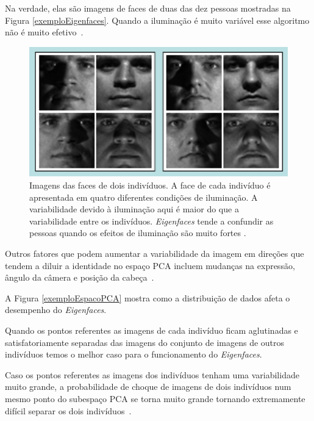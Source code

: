 Na verdade, elas são imagens de faces de duas das dez pessoas mostradas na Figura \ref{exemploEigenfaces}. Quando a iluminação é muito variável esse algoritmo não é muito efetivo~\cite{hewitt}.

	\begin{figure}[hbt]
		\begin{center}
			\includegraphics[width=15cm]{figuras/2.FundamentacaoTeorica/exemplosImagensIluminacaoo.png}
		\end{center}
		\caption{Imagens das faces de dois indivíduos. A face de cada indivíduo é apresentada em quatro diferentes condições de iluminação. A variabilidade devido à iluminação aqui é maior do que a variabilidade entre os indivíduos. \textit{Eigenfaces} tende a confundir as pessoas quando os efeitos de iluminação são muito fortes \cite{hewitt}.}
		\label{exemplosImagensIluminacaoo}
	\end{figure}

Outros fatores que podem aumentar a variabilidade da imagem em direções que tendem a diluir a identidade no espaço PCA incluem mudanças na expressão, ângulo da câmera e posição da cabeça~\cite{hewitt}.

A Figura \ref{exemploEspacoPCA} mostra como a distribuição de dados afeta o desempenho do \textit{Eigenfaces}.

Quando os pontos referentes as imagens de cada indivíduo ficam aglutinadas e satisfatoriamente separadas das imagens do conjunto de imagens de outros indivíduos temos o melhor caso para o funcionamento do \textit{Eigenfaces}.

Caso os pontos referentes as imagens dos indivíduos tenham uma variabilidade muito grande, a probabilidade de choque de imagens de dois indivíduos num mesmo ponto do subespaço PCA se torna muito grande tornando extremamente difícil separar os dois indivíduos~\cite{hewitt}.

